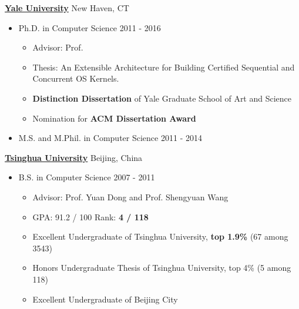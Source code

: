 \documentclass[11pt]{article}
\newcommand{\mhref}[3][black]{\href{#2}{\color{#1}{#3}}}%
\newenvironment{innerlist}[1][\enskip\textbullet]%
        {\begin{itemize}[#1,leftmargin=*,parsep=0pt,itemsep=2pt,topsep=2pt,partopsep=0pt]}
        {\end{itemize}}
\newcommand\zhong{\mhref{http://www.cs.yale.edu/homes/shao/}{Zhong Shao}}
\begin{document}
\href{http://www.yale.edu}{\textbf{Yale University}}
\hfill New Haven, CT
\begin{innerlist}

\item[] Ph.D. in Computer Science 
\hfill {2011 - 2016}
        \begin{innerlist}
       \item Advisor: Prof. \zhong
       \item Thesis: An Extensible Architecture for Building Certified Sequential and Concurrent OS Kernels.
       \item \textbf{Distinction Dissertation} of Yale Graduate School of Art and Science
       \item Nomination for \textbf{ACM Dissertation Award}
        \end{innerlist}
\item[] M.S. and M.Phil. in Computer Science
\hfill {2011 - 2014}
\begin{comment}
        \begin{innerlist}
        \item GPA: 3.9 / 4
        \end{innerlist}
\end{comment}

\end{innerlist}
\vspace{.08in}
\href{http://www.tsinghua.edu.cn/publish/newthuen/index.html}{\textbf{Tsinghua University}}
\hfill Beijing, China
\begin{innerlist}
\item[] B.S. in Computer Science %
\hfill {2007 - 2011}
        \begin{innerlist}
        \item Advisor: Prof. Yuan Dong and Prof. Shengyuan Wang
        \item GPA: 91.2 / 100 \qquad Rank: \textbf{4 / 118}
        \item Excellent Undergraduate of Tsinghua University, \textbf{top 1.9\%} (67 among 3543)
        \item Honors Undergraduate Thesis of Tsinghua University, top 4\% (5 among 118)
        \item Excellent Undergraduate of Beijing City
        \end{innerlist}

\end{innerlist}
\end{document}
